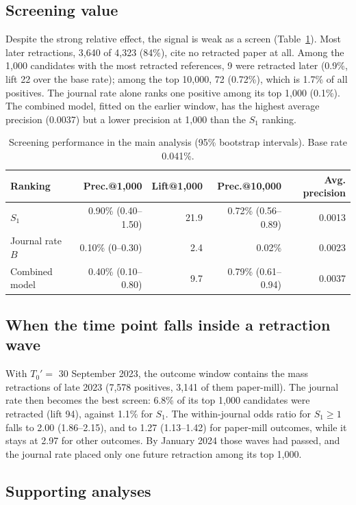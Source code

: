 \subsection{Screening value}
Despite the strong relative effect, the signal is weak as a screen (Table~\ref{tab:screen}). Most later retractions,
3,640 of 4,323 (84\%), cite no retracted paper at all. Among the 1,000 candidates with the most retracted references,
9 were retracted later (0.9\%, lift 22 over the base rate); among the top 10,000, 72 (0.72\%), which is 1.7\% of all
positives. The journal rate alone ranks one positive among its top 1,000 (0.1\%). The combined model, fitted on the earlier
window, has the highest average precision (0.0037) but a lower precision at 1,000 than the $S_1$ ranking.

\begin{table}[t]
\centering
\caption{Screening performance in the main analysis (95\% bootstrap intervals). Base rate 0.041\%.}\label{tab:screen}
\begin{tabular}{lrrrr}
\toprule
Ranking & Prec.@1,000 & Lift@1,000 & Prec.@10,000 & Avg. precision \\
\midrule
$S_1$ & 0.90\% (0.40--1.50) & 21.9 & 0.72\% (0.56--0.89) & 0.0013 \\
Journal rate $B$ & 0.10\% (0--0.30) & 2.4 & 0.02\% & 0.0023 \\
Combined model & 0.40\% (0.10--0.80) & 9.7 & 0.79\% (0.61--0.94) & 0.0037 \\
\bottomrule
\end{tabular}
\end{table}

\subsection{When the time point falls inside a retraction wave}
With $T_0' = $ 30 September 2023, the outcome window contains the mass retractions of late 2023 (7,578 positives,
3,141 of them paper-mill). The journal rate then becomes the best screen: 6.8\% of its top 1,000 candidates were
retracted (lift 94), against 1.1\% for $S_1$. The within-journal odds ratio for $S_1 \ge 1$ falls to 2.00
(1.86--2.15), and to 1.27 (1.13--1.42) for paper-mill outcomes, while it stays at 2.97 for other outcomes. By
January 2024 those waves had passed, and the journal rate placed only one future retraction among its top 1,000.

\subsection{Supporting analyses}
